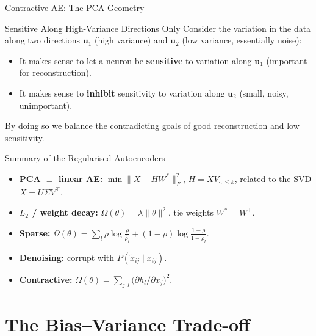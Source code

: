 \documentclass{beamer}
\begin{document}
\begin{frame}[shrink=10]{Contractive AE: The PCA Geometry}
  \begin{block}{Sensitive Along High-Variance Directions Only}
    Consider the variation in the data along two directions $\mathbf{u}_1$
    (high variance) and $\mathbf{u}_2$ (low variance, essentially noise):
    \begin{itemize}\setlength\itemsep{3pt}
      \item It makes sense to let a neuron be \textbf{sensitive} to
            variation along $\mathbf{u}_1$ (important for reconstruction).
      \item It makes sense to \textbf{inhibit} sensitivity to variation
            along $\mathbf{u}_2$ (small, noisy, unimportant).
    \end{itemize}
    By doing so we balance the contradicting goals of good reconstruction
    and low sensitivity.
  \end{block}

  \begin{exampleblock}{Summary of the Regularised Autoencoders}
    \begin{itemize}\setlength\itemsep{2pt}
      \item \textbf{PCA $\equiv$ linear AE:} $\min\|X-HW^{*}\|_F^2$,
            $H = X V_{\cdot,\le k}$, related to the SVD $X = U\Sigma V^{\top}$.
      \item \textbf{$L_2$ / weight decay:} $\Omega(\theta) = \lambda\|\theta\|^2$,
            tie weights $W^{*}=W^{\top}$.
      \item \textbf{Sparse:} $\Omega(\theta) = \sum_l \rho\log\frac{\rho}{\hat\rho_l}
            + (1-\rho)\log\frac{1-\rho}{1-\hat\rho_l}$.
      \item \textbf{Denoising:} corrupt with $P(\tilde{x}_{ij}\mid x_{ij})$.
      \item \textbf{Contractive:} $\Omega(\theta)
            = \sum_{j,l}\bigl(\partial h_l/\partial x_j\bigr)^2$.
    \end{itemize}
  \end{exampleblock}
\end{frame}

\section{The Bias--Variance Trade-off}
\end{document}
